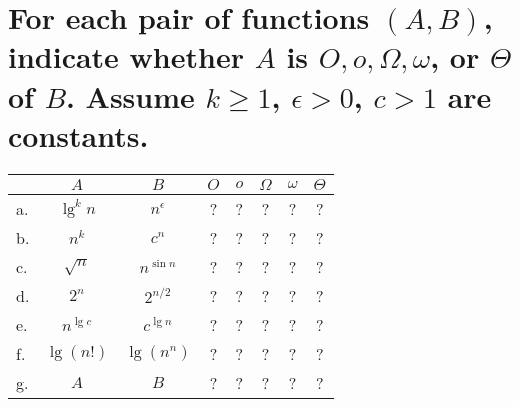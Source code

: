 \section[Problem 5]{For each pair of functions $(A, B)$, indicate whether $A$ is $O, o, \Omega, \omega$, or $\Theta$ of $B$. Assume $k \geq 1$, $\epsilon > 0$, $c > 1$ are constants.}
\begin{center}
	\begin{tabular}{lcc|c|c|c|c|c}
		& $A$ & $B$ & $O$ & $o$ & $\Omega$ & $\omega$ & $\Theta$ \\ \hline
		a. & $\lg^k n$ & $n^{\epsilon}$ & ? & ? & ? & ? & ? \\ \hline
		b. & $n^k$ & $c^n$ & ? & ? & ? & ? & ? \\ \hline
		c. & $\sqrt{n}$ & $n^{\sin n}$ & ? & ? & ? & ? & ? \\ \hline
		d. & $2^n$ & $2^{n/2}$ & ? & ? & ? & ? & ? \\ \hline
		e. & $n^{\lg c}$ & $c^{\lg n}$ & ? & ? & ? & ? & ? \\ \hline
		f. & $\lg(n!)$ & $\lg(n^n)$ & ? & ? & ? & ? & ? \\ \hline
		g. & $A$ & $B$ & ? & ? & ? & ? & ?
	\end{tabular}
\end{center}


